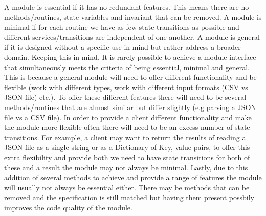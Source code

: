 \documentclass[12pt]{article}
\begin{document}
\begin{enumerate}
  A module is essential if it has no redundant features. This means there are no methods/routines, state variables and invariant that can be removed. A module is minimal if for each routine we have as few state transitions as possible and different services/transitions are independent of one another. A module is general if it is designed without a specific use in mind but rather address a broader domain. Keeping this in mind, It is rarely possible to achieve a module interface that simultaneously meets the criteria of being essential, minimal and general. This is because a general module will need to offer different functionality and be flexible (work with different types, work with different input formats (CSV vs JSON file) etc.). To offer these different features there will need to be several methods/routines that are almost similar but differ slightly (e.g parsing a JSON file vs a CSV file). In order to provide a client different functionality and make the module more flexible often there will need to be an excess number of state transitions. For example, a client may want to return the results of reading a JSON file as a single string or as a Dictionary of Key, value pairs, to offer this extra flexibility and provide both we need to have state transitions for both of these and a result the module may not always be minimal. Lastly, due to this addition of several methods to achieve and provide a range of features the module will usually not always be essential either. There may be methods that can be removed and the specification is still matched but having them present possbily improves the code quality of the module. 
  
  
\end{enumerate}
\end{document}
